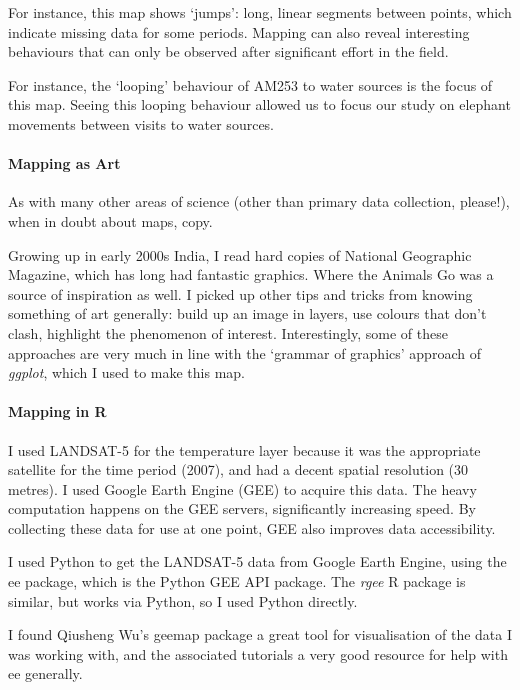 	\medskip

	For instance, this map shows `jumps': long, linear segments between points, which indicate missing data for some periods. Mapping can also reveal interesting behaviours that can only be observed after significant effort in the field.

	For instance, the `looping' behaviour of AM253 to water sources is the focus of this map. Seeing this looping behaviour allowed us to focus our study on elephant movements between visits to water sources.

	\medskip

	\paragraph*{Mapping as Art}

	As with many other areas of science (other than primary data collection, please!), when in doubt about maps, copy.

	Growing up in early 2000s India, I read hard copies of National Geographic Magazine, which has long had fantastic graphics. Where the Animals Go was a source of inspiration as well. I picked up other tips and tricks from knowing something of art generally: build up an image in layers, use colours that don't clash, highlight the phenomenon of interest. Interestingly, some of these approaches are very much in line with the `grammar of graphics' approach of \textit{ggplot}, which I used to make this map.

	\medskip

	\paragraph*{Mapping in R}

	I used LANDSAT-5 for the temperature layer because it was the appropriate satellite for the time period (2007), and had a decent spatial resolution (30 metres). I used Google Earth Engine (GEE) to acquire this data. The heavy computation happens on the GEE servers, significantly increasing speed. By collecting these data for use at one point, GEE also improves data accessibility.

	I used Python to get the LANDSAT-5 data from Google Earth Engine, using the ee package, which is the Python GEE API package. The \textit{rgee} R package is similar, but works via Python, so I used Python directly.

	I found Qiusheng Wu's geemap package a great tool for visualisation of the data I was working with, and the associated tutorials a very good resource for help with ee generally.


